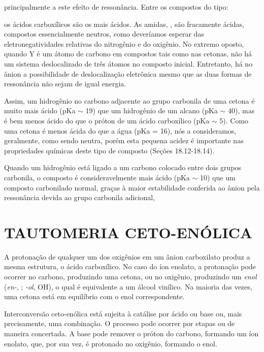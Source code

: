 \noindent principalmente a este efeito de ressonância.
\noindent Entre os compostos do tipo:

\noindent os ácidos carboxílicos são os mais ácidos. As amidas, , são fracamente ácidas, compostos essencialmente neutros, como deveríamos esperar das eletronegatividades relativas do nitrogênio e do oxigênio. No extremo oposto, quando Y é um átomo de carbono em compostos tais como nas cetonas, não há um sistema deslocalizado de três átomos no composto inicial. Entretanto, há no ânion a possibilidade de deslocalização eletrônica mesmo que as duas formas de ressonância não sejam de igual energia.



Assim, um hidrogênio no carbono adjacente ao grupo carbonila de uma cetona é muito mais ácido (pKa $\sim$ 19) que um hidrogênio de um alcano (pKa $\sim$ 40), mas é bem menos ácido do que o próton de um ácido carboxílico (pKa $\sim$ 5). Como uma cetona é menos ácida do que a água (pKa = 16), nós a consideramos, geralmente, como sendo neutra, porém esta pequena acidez é importante nas propriedades químicas deste tipo de composto (Seções 18.12-18.14). 

Quando um hidrogênio está ligado a um carbono colocado entre dois grupos carbonila, o composto é consideravelmente mais ácido (pKa $\sim$ 10) que um composto carbonilado normal, graças à maior estabilidade conferida ao ânion pela ressonância devida ao grupo carbonila adicional, 



\section{TAUTOMERIA CETO-ENÓLICA}

A protonação de qualquer um dos oxigênios em um ânion carboxilato produz a mesma estrutura, o ácido carboxílico. No caso do íon enolato, a protonação pode ocorrer no carbono, produzindo uma cetona, ou no oxigênio, produzindo um \textit{enol} (\textit{en-}, ; \textit{-ol}, OH), o qual é equivalente a um álcool vinílico. Na maioria das vezes, uma cetona está em equilíbrio com o enol correspondente. 



\noindent Interconversão ceto-enólica está sujeita à catálise por ácido ou base ou, mais precisamente, uma combinação. O processo pode ocorrer por etapas ou de maneira concertada. A base pode remover o próton do carbono, formando um íon enolato, que, por sua vez, é protonado no oxigênio, formando o enol. 

